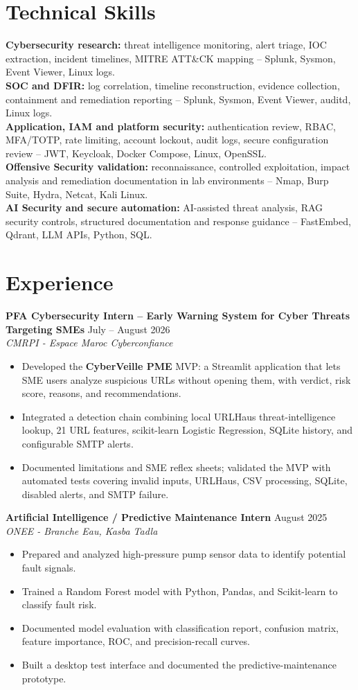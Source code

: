 \documentclass[10pt,a4paper]{article}
\newcommand{\entry}[3]{\textbf{#1} \hfill #3\\\textit{#2}\vspace{1pt}}
\begin{document}
\section{Technical Skills}
\textbf{Cybersecurity research:} threat intelligence monitoring, alert triage, IOC extraction, incident timelines, MITRE ATT\&CK mapping -- Splunk, Sysmon, Event Viewer, Linux logs.\\
\textbf{SOC and DFIR:} log correlation, timeline reconstruction, evidence collection, containment and remediation reporting -- Splunk, Sysmon, Event Viewer, auditd, Linux logs.\\
\textbf{Application, IAM and platform security:} authentication review, RBAC, MFA/TOTP, rate limiting, account lockout, audit logs, secure configuration review -- JWT, Keycloak, Docker Compose, Linux, OpenSSL.\\
\textbf{Offensive Security validation:} reconnaissance, controlled exploitation, impact analysis and remediation documentation in lab environments -- Nmap, Burp Suite, Hydra, Netcat, Kali Linux.\\
\textbf{AI Security and secure automation:} AI-assisted threat analysis, RAG security controls, structured documentation and response guidance -- FastEmbed, Qdrant, LLM APIs, Python, SQL.

\section{Experience}
\entry{PFA Cybersecurity Intern -- Early Warning System for Cyber Threats Targeting SMEs}{CMRPI - Espace Maroc Cyberconfiance}{July -- August 2026}
\begin{itemize}
  \item Developed the \textbf{CyberVeille PME} MVP: a Streamlit application that lets SME users analyze suspicious URLs without opening them, with verdict, risk score, reasons, and recommendations.
  \item Integrated a detection chain combining local URLHaus threat-intelligence lookup, 21 URL features, scikit-learn Logistic Regression, SQLite history, and configurable SMTP alerts.
  \item Documented limitations and SME reflex sheets; validated the MVP with automated tests covering invalid inputs, URLHaus, CSV processing, SQLite, disabled alerts, and SMTP failure.
\end{itemize}

\entry{Artificial Intelligence / Predictive Maintenance Intern}{ONEE - Branche Eau, Kasba Tadla}{August 2025}
\begin{itemize}
  \item Prepared and analyzed high-pressure pump sensor data to identify potential fault signals.
  \item Trained a Random Forest model with Python, Pandas, and Scikit-learn to classify fault risk.
  \item Documented model evaluation with classification report, confusion matrix, feature importance, ROC, and precision-recall curves.
  \item Built a desktop test interface and documented the predictive-maintenance prototype.
\end{itemize}
\end{document}
